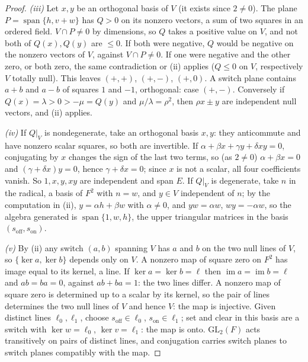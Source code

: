 \documentclass[11pt]{article}
\theoremstyle{definition}
\theoremstyle{plain}
\begin{document}
\begin{proof}
\emph{(iii)} Let $x, y$ be an orthogonal basis of $V$ (it exists since $2 \ne 0$). The plane $P = \operatorname{span}\{h, v + w\}$ has $Q > 0$ on its nonzero vectors, a sum of two squares in an ordered field. $V \cap P \ne 0$ by dimensions, so $Q$ takes a positive value on $V$, and not both of $Q(x), Q(y)$ are $\le 0$. If both were negative, $Q$ would be negative on the nonzero vectors of $V$, against $V \cap P \ne 0$. If one were negative and the other zero, or both zero, the same contradiction or (ii) applies ($Q \le 0$ on $V$, respectively $V$ totally null). This leaves $(+,+)$, $(+,-)$, $(+,0)$. A switch plane contains $a + b$ and $a - b$ of squares $1$ and $-1$, orthogonal: case $(+,-)$. Conversely if $Q(x) = \lambda > 0 > -\mu = Q(y)$ and $\mu/\lambda = \rho^{2}$, then $\rho x \pm y$ are independent null vectors, and (ii) applies.

\emph{(iv)} If $Q|_{V}$ is nondegenerate, take an orthogonal basis $x, y$: they anticommute and have nonzero scalar squares, so both are invertible. If $\alpha + \beta x + \gamma y + \delta xy = 0$, conjugating by $x$ changes the sign of the last two terms, so (as $2 \ne 0$) $\alpha + \beta x = 0$ and $(\gamma + \delta x)y = 0$, hence $\gamma + \delta x = 0$; since $x$ is not a scalar, all four coefficients vanish. So $1, x, y, xy$ are independent and span $E$. If $Q|_{V}$ is degenerate, take $n$ in the radical, a basis of $F^{2}$ with $n = w$, and $y \in V$ independent of $n$; by the computation in (ii), $y = \alpha h + \beta w$ with $\alpha \ne 0$, and $yw = \alpha w$, $wy = -\alpha w$, so the algebra generated is $\operatorname{span}\{1, w, h\}$, the upper triangular matrices in the basis $(s_{\mathrm{off}}, s_{\mathrm{on}})$.

\emph{(v)} By (ii) any switch $(a, b)$ spanning $V$ has $a$ and $b$ on the two null lines of $V$, so $\{\ker a, \ker b\}$ depends only on $V$. A nonzero map of square zero on $F^{2}$ has image equal to its kernel, a line. If $\ker a = \ker b = \ell$ then $\operatorname{im}a = \operatorname{im}b = \ell$ and $ab = ba = 0$, against $ab + ba = 1$: the two lines differ. A nonzero map of square zero is determined up to a scalar by its kernel, so the pair of lines determines the two null lines of $V$ and hence $V$: the map is injective. Given distinct lines $\ell_{0}, \ell_{1}$, choose $s_{\mathrm{off}} \in \ell_{0}$, $s_{\mathrm{on}} \in \ell_{1}$; set and clear in this basis are a switch with $\ker w = \ell_{0}$, $\ker v = \ell_{1}$: the map is onto. $\mathrm{GL}_{2}(F)$ acts transitively on pairs of distinct lines, and conjugation carries switch planes to switch planes compatibly with the map.

\end{proof}
\end{document}
